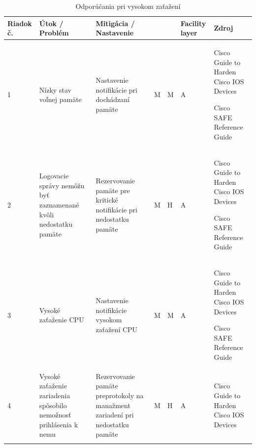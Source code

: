 \begin{longtable}[!htbp]{|C{2.5em}L{9em}L{9em}C{2em}C{2.5em}C{7.5em}L{10em}|}
	
	\hline
	\centering
	
	Riadok č.	&Útok / Problém	&Mitigácia / Nastavenie	& 	&	&Facility layer	&Zdroj\\
	\endhead
	
	 1	&Nízky stav voľnej pamäte	&Nastavenie notifikácie pri dochádzaní pamäte	&M	&M	&A	&Cisco Guide to Harden Cisco IOS Devices \cite{Singh2018}
	
	Cisco SAFE Reference Guide \cite{uYLsMtQInofenpV3}\\
	2	&Logovacie správy nemôžu byť zaznamenané kvôli nedostatku pamäte	&Rezervovanie pamäte pre kritické notifikácie pri nedostatku pamäte	&M	&H	&A	&Cisco Guide to Harden Cisco IOS Devices \cite{Singh2018}
	
	Cisco SAFE Reference Guide \cite{uYLsMtQInofenpV3}\\
	 3	&Vysoké zaťaženie CPU	&Nastavenie notifikácie vysokom zaťažení CPU	&M	&M	&A	&Cisco Guide to Harden Cisco IOS Devices \cite{Singh2018}
	
	Cisco SAFE Reference Guide \cite{uYLsMtQInofenpV3}\\
	4	&Vysoké zaťaženie zariadenia spôsobilo nemožnosť prihlásenia k nemu	&Rezervovanie pamäte preprotokoly na manažment zariadení pri nedostatku pamäte	&M	&H	&A	&Cisco Guide to Harden Cisco IOS Devices \cite{Singh2018}\\
	
	
	\hline
	\caption{Odporúčania pri vysokom zaťažení}
	\label{tab:highload}%
\end{longtable}%

